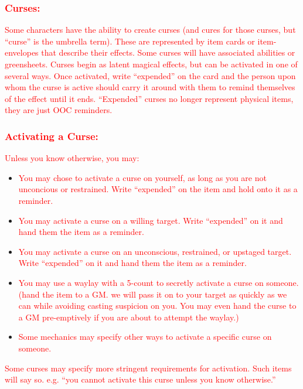 \documentclass[sheet]{GL2020}
\begin{document}
\textcolor{red}{\subsubsection{Curses:}}
\textcolor{red}{Some characters have the ability to create curses (and cures for those curses, but ``curse'' is the umbrella term). These are represented by item cards or item-envelopes that describe their effects. Some curses will have associated abilities or greensheets. Curses begin as latent magical effects, but can be activated in one of several ways. Once activated, write ``expended'' on the card and the person upon whom the curse is active should carry it around with them to remind themselves of the effect until it ends. ``Expended'' curses no longer represent physical items, they are just OOC reminders.}

\textcolor{red}{\subsubsection{Activating a Curse:}}
\textcolor{red}{Unless you know otherwise, you may:}
\begin{itemize}
	\item \textcolor{red}{You may chose to activate a curse on yourself, as long as you are not unconcious or restrained. Write ``expended'' on the item and hold onto it as a reminder.}
	\item \textcolor{red}{You may activate a curse on a willing target. Write ``expended'' on it and hand them the item as a reminder.}
	\item \textcolor{red}{You may activate a curse on an unconscious, restrained, or upstaged target. Write ``expended'' on it and hand them the item as a reminder.}
	\item \textcolor{red}{You may use a waylay with a 5-count to secretly activate a curse on someone. (hand the item to a GM. we will pass it on to your target as quickly as we can while avoiding casting suspicion on you. You may even hand the curse to a GM pre-emptively if you are about to attempt the waylay.)}
	\item \textcolor{red}{Some mechanics may specify other ways to activate a specific curse on someone.}
\end{itemize}

\textcolor{red}{Some curses may specify more stringent requirements for activation. Such items will say so. e.g. ``you cannot activate this curse unless you know otherwise.''}
\end{document}
